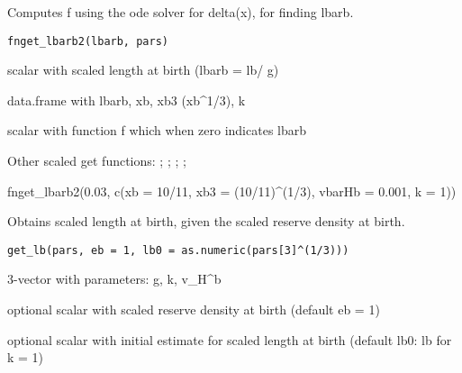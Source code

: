 \documentclass[a4paper]{book}
\begin{document}
%
\begin{Description}\relax
Computes f using the ode solver for delta(x), for finding lbarb.
\end{Description}
%
\begin{Usage}
\begin{verbatim}
fnget_lbarb2(lbarb, pars)
\end{verbatim}
\end{Usage}
%
\begin{Arguments}
\begin{ldescription}
\item[\code{lbarb}] scalar with scaled length at birth (lbarb = lb/ g)

\item[\code{pars}] data.frame with lbarb, xb, xb3 (xb\textasciicircum{}1/3), k
\end{ldescription}
\end{Arguments}
%
\begin{Value}
scalar with function f which when zero indicates lbarb
\end{Value}
%
\begin{SeeAlso}\relax
Other scaled get functions: ;
; ;
;
\end{SeeAlso}
%
\begin{Examples}
\begin{ExampleCode}
fnget_lbarb2(0.03, c(xb = 10/11, xb3 = (10/11)^(1/3), vbarHb = 0.001, k = 1))
\end{ExampleCode}
\end{Examples}
%
\begin{Description}\relax
Obtains scaled length at birth, given the scaled reserve density at birth.
\end{Description}
%
\begin{Usage}
\begin{verbatim}
get_lb(pars, eb = 1, lb0 = as.numeric(pars[3]^(1/3)))
\end{verbatim}
\end{Usage}
%
\begin{Arguments}
\begin{ldescription}
\item[\code{pars}] 3-vector with parameters: g, k, v\_H\textasciicircum{}b

\item[\code{eb}] optional scalar with scaled reserve density at birth (default eb = 1)

\item[\code{lb0}] optional scalar with initial estimate for scaled length at birth (default lb0: lb for k = 1)
\end{ldescription}
\end{Arguments}
\end{document}
